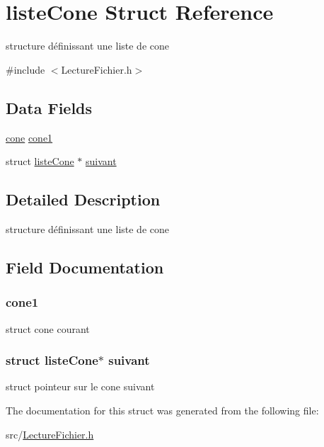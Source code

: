 \hypertarget{structliste_cone}{
\section{listeCone Struct Reference}
\label{structliste_cone}
}


structure définissant une liste de cone  




{\ttfamily \#include $<$LectureFichier.h$>$}

\subsection*{Data Fields}
\begin{DoxyCompactItemize}
\item 
\hyperlink{structcone}{cone} \hyperlink{structliste_cone_a645e834ddac4b3d84fcde309549ab01c}{cone1}
\item 
struct \hyperlink{structliste_cone}{listeCone} $\ast$ \hyperlink{structliste_cone_a900a56f2d6d54f477f3520a865258820}{suivant}
\end{DoxyCompactItemize}


\subsection{Detailed Description}
structure définissant une liste de cone 

\subsection{Field Documentation}
\hypertarget{structliste_cone_a645e834ddac4b3d84fcde309549ab01c}{
\subsubsection[{cone1}]{ {\bf cone1}}}
\label{structliste_cone_a645e834ddac4b3d84fcde309549ab01c}
struct cone courant \hypertarget{structliste_cone_a900a56f2d6d54f477f3520a865258820}{
\subsubsection[{suivant}]{\setlength{\rightskip}{0pt plus 5cm}struct {\bf listeCone}$\ast$ {\bf suivant}}}
\label{structliste_cone_a900a56f2d6d54f477f3520a865258820}
struct pointeur sur le cone suivant 

The documentation for this struct was generated from the following file:\begin{DoxyCompactItemize}
\item 
src/\hyperlink{_lecture_fichier_8h}{LectureFichier.h}\end{DoxyCompactItemize}
